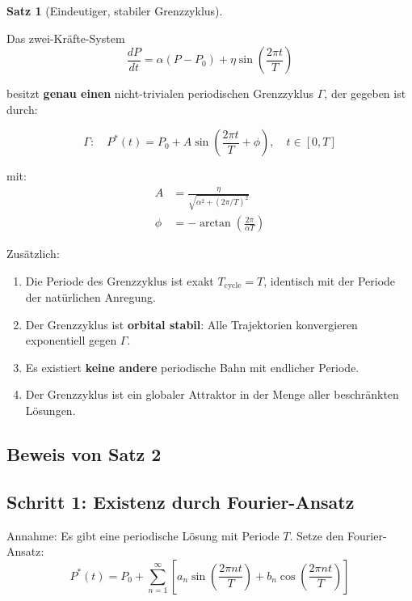 \documentclass[a4paper, 12pt, twoside, openright]{report}
\theoremstyle{definition}
\theoremstyle{definition}
\newtheorem{satz}{Satz}[chapter]
\begin{document}
\begin{satz}[Eindeutiger, stabiler Grenzzyklus]\label{satz:grenzzyklus}
    
    Das zwei-Kräfte-System
    \begin{equation}
        \frac{dP}{dt} = \alpha(P - P_0) + \eta \sin\left(\frac{2\pi t}{T}\right)
    \end{equation}
    
    besitzt \textbf{genau einen} nicht-trivialen periodischen Grenzzyklus $\Gamma$, der gegeben ist durch:
    
    \begin{equation}
        \boxed{\Gamma: \quad P^*(t) = P_0 + A \sin\left(\frac{2\pi t}{T} + \phi\right), \quad t \in [0, T]}
    \end{equation}
    
    mit:
    \begin{align}
        A &= \frac{\eta}{\sqrt{\alpha^2 + (2\pi/T)^2}} \label{eq:amplitude}\\
        \phi &= -\arctan\left(\frac{2\pi}{\alpha T}\right) \label{eq:phase}
    \end{align}
    
    Zusätzlich:
    \begin{enumerate}
        \item Die Periode des Grenzzyklus ist exakt $T_{\text{cycle}} = T$, identisch mit der Periode der natürlichen Anregung.
        \item Der Grenzzyklus ist \textbf{orbital stabil}: Alle Trajektorien konvergieren exponentiell gegen $\Gamma$.
        \item Es existiert \textbf{keine andere} periodische Bahn mit endlicher Periode.
        \item Der Grenzzyklus ist ein globaler Attraktor in der Menge aller beschränkten Lösungen.
    \end{enumerate}
\end{satz}

\subsection{Beweis von Satz 2}

\subsection{Schritt 1: Existenz durch Fourier-Ansatz}

Annahme: Es gibt eine periodische Lösung mit Periode $T$. Setze den Fourier-Ansatz:
\begin{equation}
    P^*(t) = P_0 + \sum_{n=1}^{\infty} \left[a_n \sin\left(\frac{2\pi n t}{T}\right) + b_n \cos\left(\frac{2\pi n t}{T}\right)\right]
\end{equation}
\end{document}
